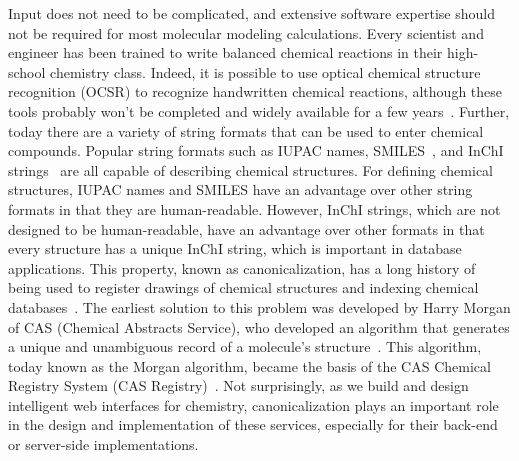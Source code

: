 \documentclass[runningheads,a4paper]{llncs}
\begin{document}
Input does not need to be complicated, and extensive software expertise should not be required for most molecular modeling calculations.  Every scientist and engineer has been trained to write balanced chemical reactions in their high-school chemistry class.  Indeed, it is possible to use optical chemical structure recognition (OCSR) to recognize handwritten chemical reactions, although these tools probably won't be completed and widely available for a few years~\cite{mcdaniel1992kekule,casey1993optical,rajan2020review,oldenhof2020chemgrapher}.  
Further, today there are a variety of string formats that can be used to enter chemical compounds.  Popular string formats such as IUPAC names, SMILES~\cite{weininger1988smiles,weininger1989smiles}, and InChI strings~\cite{heller2013inchi,heller2015inchi} are all capable of describing chemical structures. For defining chemical structures, IUPAC names and SMILES have an advantage over other string formats in that they are human-readable. However, InChI strings, which are not designed to be human-readable, have an advantage over other formats in that every structure has a unique InChI string, which is important in database applications.  This property, known as canonicalization, has a long history of being used to register drawings of chemical structures
and indexing chemical databases~\cite{morgan1965generation,ullmann1976algorithm,weininger1989smiles,schneider2015get}.  The earliest solution to this problem was developed 
by Harry Morgan of CAS (Chemical Abstracts Service), who developed an algorithm that generates a unique and unambiguous record of a molecule's structure~\cite{morgan1965generation}.  This algorithm, today known as the Morgan algorithm, became the basis of the CAS Chemical Registry System (CAS Registry)~\cite{ginsberg2007overview}.  
Not surprisingly, as we build and design intelligent web interfaces for chemistry, canonicalization plays an important role in the design and implementation of these services, especially for their back-end or server-side implementations.
\end{document}
